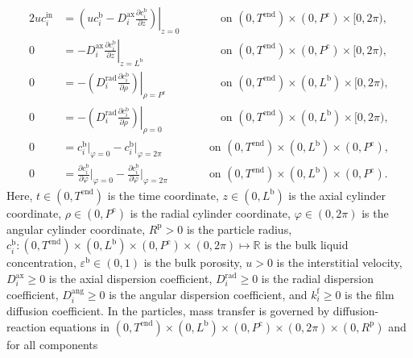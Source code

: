 \documentclass{article}
\begin{document}
\begin{alignat}{2}
    u c^{\mathrm{in}}_{i}
    &= \left.\left( u c^{\mathrm{b}}_{i} - D^{\mathrm{ax}}_{i} \frac{\partial c^{\mathrm{b}}_{i}}{\partial z}\right)\right|_{z=0}
    & & \qquad\text{on }(0, T^{\mathrm{end}})\times (0, P^{\mathrm{c}}) \times [0,2\pi),
    \\
    0
    &= - D^{\mathrm{ax}}_{i} \left. \frac{\partial c^{\mathrm{b}}_{i}}{\partial z} \right|_{z=L^{\mathrm{b}}}
    & & \qquad\text{on }(0, T^{\mathrm{end}})\times (0, P^{\mathrm{c}}) \times [0,2\pi),
    \\
    0
    &= - \left(D^{\mathrm{rad}}_{i} \left. \frac{\partial c^{\mathrm{b}}_{i}}{\partial \rho} \right) \right|_{\rho=P^{\mathrm{c}}}
    & & \qquad\text{on }(0, T^{\mathrm{end}}) \times (0, L^{\mathrm{b}}) \times [0,2\pi),
    \\
    0
    &= - \left(D^{\mathrm{rad}}_{i} \left. \frac{\partial c^{\mathrm{b}}_{i}}{\partial \rho} \right) \right|_{\rho=0}
    & & \qquad\text{on }(0, T^{\mathrm{end}}) \times (0, L^{\mathrm{b}}) \times [0,2\pi),
    \\
    0
    &= c^{\mathrm{b}}_{i} \Big|_{\varphi=0}
        - c^{\mathrm{b}}_{i} \Big|_{\varphi=2\pi}
    & & \quad \text{on }(0, T^{\mathrm{end}}) \times (0, L^{\mathrm{b}}) \times (0, P^{\mathrm{c}}),
    \\
    0
    &= \frac{\partial c^{\mathrm{b}}_{i}}{\partial \varphi} \bigg|_{\varphi=0}
        - \frac{\partial c^{\mathrm{b}}_{i}}{\partial \varphi} \bigg|_{\varphi=2\pi}
    & & \quad \text{on }(0, T^{\mathrm{end}}) \times (0, L^{\mathrm{b}}) \times (0, P^{\mathrm{c}}).
\end{alignat}
Here, $t\in (0, T^{\mathrm{end}})$ is the time coordinate, $z\in (0, L^{\mathrm{b}})$ is the axial cylinder coordinate, $\rho\in (0, P^{\mathrm{c}})$ is the radial cylinder coordinate, $\varphi\in (0, 2\pi)$ is the angular cylinder coordinate, $R^{\mathrm{p}}> 0$ is the particle radius, $c^{\mathrm{b}}_{i}\colon (0, T^{\mathrm{end}})\times (0, L^{\mathrm{b}})\times (0, P^{\mathrm{c}})\times (0, 2\pi) \mapsto \mathbb{R}$ is the bulk liquid concentration, $\varepsilon^{\mathrm{b}}\in (0, 1)$ is the bulk porosity, $u> 0$ is the interstitial velocity, $D^{\mathrm{ax}}_{i}\geq 0$ is the axial dispersion coefficient, $D^{\mathrm{rad}}_{i}\geq 0$ is the radial dispersion coefficient, $D^{\mathrm{ang}}_{i}\geq 0$ is the angular dispersion coefficient, and $k^{\mathrm{f}}_{i}\geq 0$ is the film diffusion coefficient.
In the particles, mass transfer is governed by diffusion-reaction equations in $(0, T^{\mathrm{end}}) \times (0, L^{\mathrm{b}})\times (0, P^{\mathrm{c}})\times (0, 2\pi)\times (0, R^{\mathrm{p}})$ and for all components
\end{document}
